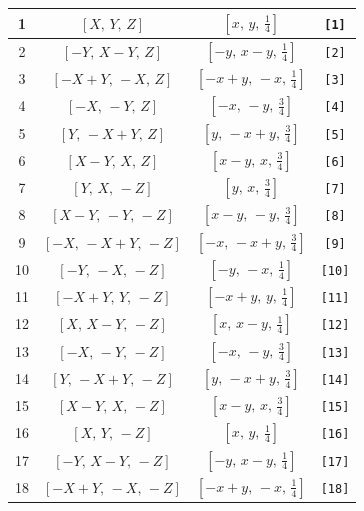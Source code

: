 \documentclass[fleqn,8pt]{jsarticle}
\begin{document}
\begin{longtable}{cccc}
1 & $\left[ X,\, Y,\, Z \right]$ & $\left[ x,\, y,\, \frac{1}{4} \right]$ & {\tt [1]} \\ \hline
2 & $\left[ - Y,\, X - Y,\, Z \right]$ & $\left[ - y,\, x - y,\, \frac{1}{4} \right]$ & {\tt [2]} \\ \hline
3 & $\left[ - X + Y,\, - X,\, Z \right]$ & $\left[ - x + y,\, - x,\, \frac{1}{4} \right]$ & {\tt [3]} \\ \hline
4 & $\left[ - X,\, - Y,\, Z \right]$ & $\left[ - x,\, - y,\, \frac{3}{4} \right]$ & {\tt [4]} \\ \hline
5 & $\left[ Y,\, - X + Y,\, Z \right]$ & $\left[ y,\, - x + y,\, \frac{3}{4} \right]$ & {\tt [5]} \\ \hline
6 & $\left[ X - Y,\, X,\, Z \right]$ & $\left[ x - y,\, x,\, \frac{3}{4} \right]$ & {\tt [6]} \\ \hline
7 & $\left[ Y,\, X,\, - Z \right]$ & $\left[ y,\, x,\, \frac{3}{4} \right]$ & {\tt [7]} \\ \hline
8 & $\left[ X - Y,\, - Y,\, - Z \right]$ & $\left[ x - y,\, - y,\, \frac{3}{4} \right]$ & {\tt [8]} \\ \hline
9 & $\left[ - X,\, - X + Y,\, - Z \right]$ & $\left[ - x,\, - x + y,\, \frac{3}{4} \right]$ & {\tt [9]} \\ \hline
10 & $\left[ - Y,\, - X,\, - Z \right]$ & $\left[ - y,\, - x,\, \frac{1}{4} \right]$ & {\tt [10]} \\ \hline
11 & $\left[ - X + Y,\, Y,\, - Z \right]$ & $\left[ - x + y,\, y,\, \frac{1}{4} \right]$ & {\tt [11]} \\ \hline
12 & $\left[ X,\, X - Y,\, - Z \right]$ & $\left[ x,\, x - y,\, \frac{1}{4} \right]$ & {\tt [12]} \\ \hline
13 & $\left[ - X,\, - Y,\, - Z \right]$ & $\left[ - x,\, - y,\, \frac{3}{4} \right]$ & {\tt [13]} \\ \hline
14 & $\left[ Y,\, - X + Y,\, - Z \right]$ & $\left[ y,\, - x + y,\, \frac{3}{4} \right]$ & {\tt [14]} \\ \hline
15 & $\left[ X - Y,\, X,\, - Z \right]$ & $\left[ x - y,\, x,\, \frac{3}{4} \right]$ & {\tt [15]} \\ \hline
16 & $\left[ X,\, Y,\, - Z \right]$ & $\left[ x,\, y,\, \frac{1}{4} \right]$ & {\tt [16]} \\ \hline
17 & $\left[ - Y,\, X - Y,\, - Z \right]$ & $\left[ - y,\, x - y,\, \frac{1}{4} \right]$ & {\tt [17]} \\ \hline
18 & $\left[ - X + Y,\, - X,\, - Z \right]$ & $\left[ - x + y,\, - x,\, \frac{1}{4} \right]$ & {\tt [18]} \\ \hline

\end{longtable}
\end{document}
